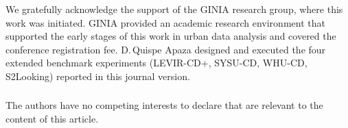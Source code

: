 \documentclass[runningheads]{llncs}
\newcommand{\journal}[1]{{\color{orange}#1}}
\begin{document}
\begin{credits}
\subsubsection{\ackname}
We gratefully acknowledge the support of the GINIA research group, where this
work was initiated. GINIA provided an academic research environment that
supported the early stages of this work in urban data analysis and covered the
conference registration fee.
\journal{D.\,Quispe Apaza designed and executed the four extended benchmark experiments (LEVIR-CD+, SYSU-CD, WHU-CD, S2Looking) reported in this journal
version.}

\journal{\subsubsection{\discintname}
The authors have no competing interests to declare that are relevant to the
content of this article.}
\end{credits}



\end{document}

